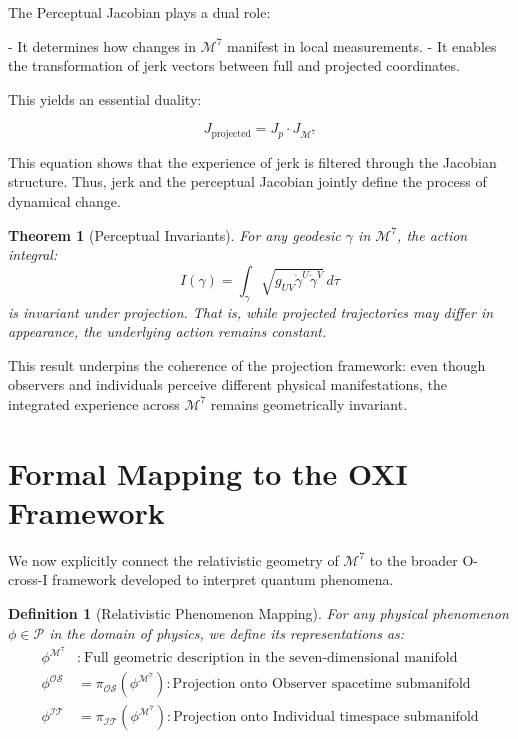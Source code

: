 \documentclass{article}
\newtheorem{definition}{Definition}
\newtheorem{theorem}{Theorem}
\begin{document}
The Perceptual Jacobian plays a dual role:

- It determines how changes in $\mathcal{M}^7$ manifest in local measurements.
- It enables the transformation of jerk vectors between full and projected coordinates.

This yields an essential duality:

\begin{equation}
J_{\text{projected}} = J_p \cdot J_{\mathcal{M}^7}
\end{equation}

This equation shows that the experience of jerk is filtered through the Jacobian structure. Thus, jerk and the perceptual Jacobian jointly define the process of dynamical change.

\begin{theorem}[Perceptual Invariants]
For any geodesic $\gamma$ in $\mathcal{M}^7$, the action integral:
\begin{equation}
I(\gamma) = \int_{\gamma} \sqrt{g_{UV}\dot{\gamma}^U\dot{\gamma}^V} \, d\tau
\end{equation}
is invariant under projection. That is, while projected trajectories may differ in appearance, the underlying action remains constant.
\end{theorem}

This result underpins the coherence of the projection framework: even though observers and individuals perceive different physical manifestations, the integrated experience across $\mathcal{M}^7$ remains geometrically invariant.




\section{Formal Mapping to the OXI Framework}

We now explicitly connect the relativistic geometry of \( \mathcal{M}^7 \) to the broader O-cross-I framework developed to interpret quantum phenomena.

\begin{definition}[Relativistic Phenomenon Mapping]
For any physical phenomenon \( \phi \in \mathcal{P} \) in the domain of physics, we define its representations as:
\begin{align}
\phi^{\mathcal{M}^7} &:\ \text{Full geometric description in the seven-dimensional manifold} \\
\phi^{\mathcal{OS}} &= \pi_{\mathcal{OS}}(\phi^{\mathcal{M}^7}) : \text{Projection onto Observer spacetime submanifold} \\
\phi^{\mathcal{IT}} &= \pi_{\mathcal{IT}}(\phi^{\mathcal{M}^7}) : \text{Projection onto Individual timespace submanifold}
\end{align}
\end{definition}
\end{document}
